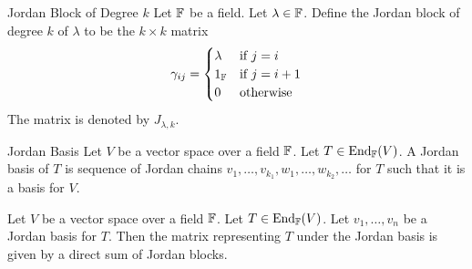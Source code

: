 \documentclass[a4paper]{article}
\begin{document}
\begin{defn}{Jordan Block of Degree $k$}{} Let $\mathbb{F}$ be a field. Let $\lambda\in\mathbb{F}$. Define the Jordan block of degree $k$ of $\lambda$ to be the $k\times k$ matrix $$
\gamma_{ij}=\begin{cases}
\lambda & \text{if $j=i$}\\
1_{\mathbb{F}} & \text{if $j=i+1$}\\
0 & \text{otherwise}
\end{cases}$$
The matrix is denoted by $J_{\lambda,k}$. 
\end{defn}

\begin{defn}{Jordan Basis}{} Let $V$ be a vector space over a field $\mathbb{F}$. Let $T\in\text{End}_{\mathbb{F}}(V)$. A Jordan basis of $T$ is sequence of Jordan chains $v_1,\dots,v_{k_1},w_1,\dots,w_{k_2},\dots$ for $T$ such that it is a basis for $V$. 
\end{defn}

\begin{prp}{}{} Let $V$ be a vector space over a field $\mathbb{F}$. Let $T\in\text{End}_{\mathbb{F}}(V)$. Let $v_1,\dots,v_n$ be a Jordan basis for $T$. Then the matrix representing $T$ under the Jordan basis is given by a direct sum of Jordan blocks. 
\end{prp}
\end{document}
